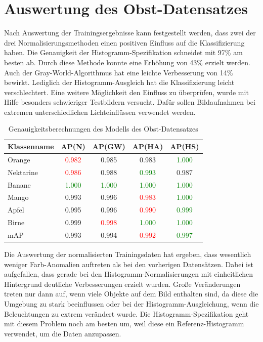 \section{Auswertung des Obst-Datensatzes}
Nach Auswertung der Trainingsergebnisse kann festgestellt werden, dass zwei der drei Normalisierungsmethoden einen positiven Einfluss auf die Klassifizierung haben. Die Genauigkeit der Histogramm-Spezifikation schneidet mit 97\% am besten ab. Durch diese Methode konnte eine Erhöhung von 43\% erzielt werden. Auch der Gray-World-Algorithmus hat eine leichte Verbesserung von 14\% bewirkt. Lediglich der Histogramm-Ausgleich hat die Klassifizierung leicht verschlechtert. Eine weitere Möglichkeit den Einfluss zu überprüfen, wurde mit Hilfe besonders schwieriger Testbildern versucht. Dafür sollen Bildaufnahmen bei extremen unterschiedlichen Lichteinflüssen verwendet werden.
\begin{table}
[h]
\caption{Genauigkeitsberechnungen des Modells des Obst-Datensatzes}
\centering
\begin{tabular}{|l|c|c|c|c|}
\hline
Klassenname & AP(N) & AP(GW) & AP(HA) & AP(HS)\\
\hline
Orange & \textcolor{red}{0.982} & 0.985 & 0.983 & \textcolor{green}{1.000}\\
Nektarine & \textcolor{red}{0.986} & 0.988 & \textcolor{green}{0.993} & 0.987\\
Banane & \textcolor{green}{1.000} & \textcolor{green}{1.000} & \textcolor{green}{1.000} & \textcolor{green}{1.000}\\
Mango & 0.993 & 0.996 & \textcolor{red}{0.983} & \textcolor{green}{1.000}\\
Apfel & 0.995 & 0.996 & \textcolor{red}{0.990} & \textcolor{green}{0.999}\\
Birne & 0.999 & \textcolor{red}{0.998} & \textcolor{green}{1.000} & \textcolor{green}{1.000}\\
\hline
mAP & 0.993 & 0.994 & \textcolor{red}{0.992} & \textcolor{green}{0.997}\\
\hline
\end{tabular}
\end{table}
Die Auswertung der normalisierten Trainingsdaten hat ergeben, dass wesentlich weniger Farb-Anomalien auftreten als bei den vorherigen Datensätzen. Dabei ist aufgefallen, dass gerade bei den Histogramm-Normalisierungen mit einheitlichen Hintergrund deutliche Verbesserungen erzielt wurden. Große Veränderungen treten nur dann auf, wenn viele Objekte auf dem Bild enthalten sind, da diese die Umgebung zu stark beeinflussen oder bei der Histogramm-Ausgleichung, wenn die Beleuchtungen zu extrem verändert wurde. Die Histogramm-Spezifikation geht mit diesem Problem noch am besten um, weil diese ein Referenz-Histogramm verwendet, um die Daten anzupassen. \\\\
